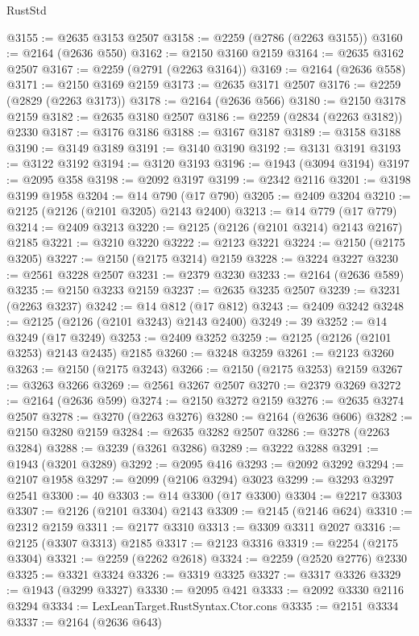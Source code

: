 \begin{lexlean}{RustStd}
\begin{coremodule}
@3155 := @2635 @3153 @2507
@3158 := @2259 (@2786 (@2263 @3155))
@3160 := @2164 (@2636 @550)
@3162 := @2150 @3160 @2159
@3164 := @2635 @3162 @2507
@3167 := @2259 (@2791 (@2263 @3164))
@3169 := @2164 (@2636 @558)
@3171 := @2150 @3169 @2159
@3173 := @2635 @3171 @2507
@3176 := @2259 (@2829 (@2263 @3173))
@3178 := @2164 (@2636 @566)
@3180 := @2150 @3178 @2159
@3182 := @2635 @3180 @2507
@3186 := @2259 (@2834 (@2263 @3182)) @2330
@3187 := @3176 @3186
@3188 := @3167 @3187
@3189 := @3158 @3188
@3190 := @3149 @3189
@3191 := @3140 @3190
@3192 := @3131 @3191
@3193 := @3122 @3192
@3194 := @3120 @3193
@3196 := @1943 (@3094 @3194)
@3197 := @2095 @358
@3198 := @2092 @3197
@3199 := @2342 @2116
@3201 := @3198 @3199 @1958
@3204 := @14 @790 (@17 @790)
@3205 := @2409 @3204
@3210 := @2125 (@2126 (@2101 @3205) @2143 @2400)
@3213 := @14 @779 (@17 @779)
@3214 := @2409 @3213
@3220 := @2125 (@2126 (@2101 @3214) @2143 @2167) @2185
@3221 := @3210 @3220
@3222 := @2123 @3221
@3224 := @2150 (@2175 @3205)
@3227 := @2150 (@2175 @3214) @2159
@3228 := @3224 @3227
@3230 := @2561 @3228 @2507
@3231 := @2379 @3230
@3233 := @2164 (@2636 @589)
@3235 := @2150 @3233 @2159
@3237 := @2635 @3235 @2507
@3239 := @3231 (@2263 @3237)
@3242 := @14 @812 (@17 @812)
@3243 := @2409 @3242
@3248 := @2125 (@2126 (@2101 @3243) @2143 @2400)
@3249 := 39
@3252 := @14 @3249 (@17 @3249)
@3253 := @2409 @3252
@3259 := @2125 (@2126 (@2101 @3253) @2143 @2435) @2185
@3260 := @3248 @3259
@3261 := @2123 @3260
@3263 := @2150 (@2175 @3243)
@3266 := @2150 (@2175 @3253) @2159
@3267 := @3263 @3266
@3269 := @2561 @3267 @2507
@3270 := @2379 @3269
@3272 := @2164 (@2636 @599)
@3274 := @2150 @3272 @2159
@3276 := @2635 @3274 @2507
@3278 := @3270 (@2263 @3276)
@3280 := @2164 (@2636 @606)
@3282 := @2150 @3280 @2159
@3284 := @2635 @3282 @2507
@3286 := @3278 (@2263 @3284)
@3288 := @3239 (@3261 @3286)
@3289 := @3222 @3288
@3291 := @1943 (@3201 @3289)
@3292 := @2095 @416
@3293 := @2092 @3292
@3294 := @2107 @1958
@3297 := @2099 (@2106 @3294) @3023
@3299 := @3293 @3297 @2541
@3300 := 40
@3303 := @14 @3300 (@17 @3300)
@3304 := @2217 @3303
@3307 := @2126 (@2101 @3304) @2143
@3309 := @2145 (@2146 @624)
@3310 := @2312 @2159
@3311 := @2177 @3310
@3313 := @3309 @3311 @2027
@3316 := @2125 (@3307 @3313) @2185
@3317 := @2123 @3316
@3319 := @2254 (@2175 @3304)
@3321 := @2259 (@2262 @2618)
@3324 := @2259 (@2520 @2776) @2330
@3325 := @3321 @3324
@3326 := @3319 @3325
@3327 := @3317 @3326
@3329 := @1943 (@3299 @3327)
@3330 := @2095 @421
@3333 := @2092 @3330 @2116 @3294
@3334 := LexLeanTarget.RustSyntax.Ctor.cons
@3335 := @2151 @3334
@3337 := @2164 (@2636 @643)

\end{coremodule}
\end{lexlean}
